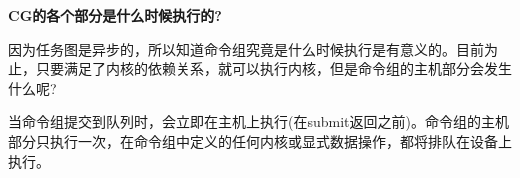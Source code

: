 \hspace*{\fill} \par %
\textbf{CG的各个部分是什么时候执行的?}

因为任务图是异步的，所以知道命令组究竟是什么时候执行是有意义的。目前为止，只要满足了内核的依赖关系，就可以执行内核，但是命令组的主机部分会发生什么呢?\par

当命令组提交到队列时，会立即在主机上执行(在submit返回之前)。命令组的主机部分只执行一次，在命令组中定义的任何内核或显式数据操作，都将排队在设备上执行。\par

































